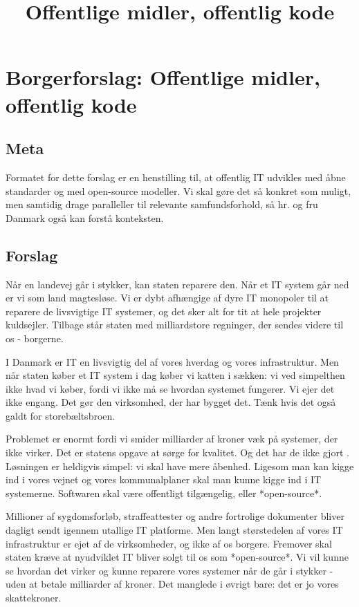 \documentclass[fleqn]{article}
\title{Offentlige midler, offentlig kode}
\author{}
\begin{document}
\maketitle

\setcounter{secnumdepth}{0}

\section{Borgerforslag: Offentlige midler, offentlig kode}

\subsection{Meta}
Formatet for dette forslag er en henstilling til, at offentlig IT udvikles med åbne
standarder og med open-source modeller. Vi skal gøre det så konkret som muligt, men 
samtidig drage paralleller til relevante samfundsforhold, så hr. og fru Danmark også 
kan forstå konteksten.

\subsection{Forslag}
Når en landevej går i stykker, kan staten reparere den. Når et IT system går ned er
vi som land magtesløse. Vi er dybt afhængige af dyre IT monopoler til at reparere de
livsvigtige IT systemer, og det sker alt for tit at hele projekter kuldsejler.
Tilbage står staten med milliardstore regninger, der sendes videre til os - borgerne.

I Danmark er IT en livsvigtig del af vores hverdag og vores infrastruktur. Men når
staten køber et IT system i dag køber vi katten i sækken: vi ved simpelthen ikke
hvad vi køber, fordi vi ikke må se hvordan systemet fungerer. Vi ejer det ikke engang.
Det gør den virksomhed, der har bygget det. Tænk hvis det også galdt for storebæltsbroen.

Problemet er enormt fordi vi smider milliarder af kroner væk på systemer, der ikke virker.
Det er statens opgave at sørge for kvalitet. Og det har de ikke gjort \cite{Lauesen}.
Løsningen er heldigvis simpel: vi skal have mere åbenhed.
Ligesom man kan kigge ind i vores vejnet og vores kommunalplaner skal man kunne
kigge ind i IT systemerne. Softwaren skal være offentligt tilgængelig, eller
*open-source*.

Millioner af sygdomsforløb, straffeattester og andre fortrolige
dokumenter bliver dagligt sendt igennem utallige IT platforme. Men langt størstedelen
af vores IT infrastruktur er ejet af de virksomheder, og ikke af os borgere.
Fremover skal staten kræve at nyudviklet IT bliver solgt til os som *open-source*.
Vi vil kunne se hvordan det virker og kunne reparere vores systemer når de går i stykker
- uden at betale milliarder af kroner.
Det manglede i øvrigt bare: det er jo vores skattekroner.
\end{document}
